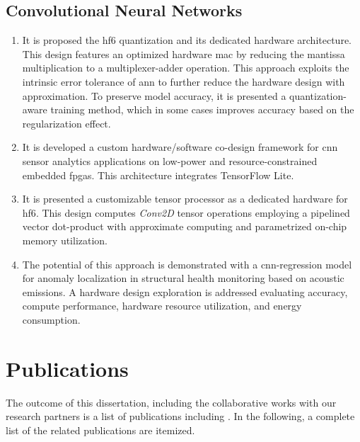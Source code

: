 \subsection{Convolutional Neural Networks}
\begin{enumerate}
	\item It is proposed the \gls{hf6} quantization and its dedicated hardware architecture. This design features an optimized hardware \gls{mac} by reducing the mantissa multiplication to a multiplexer-adder operation. This approach exploits the intrinsic error tolerance of \gls{ann} to further reduce the hardware design with approximation. To preserve model accuracy, it is presented a quantization-aware training method, which in some cases improves accuracy based on the regularization effect.
	
	\item It is developed a custom hardware/software co-design framework for \gls{cnn} sensor analytics applications on low-power and resource-constrained embedded \glspl{fpga}. This architecture integrates TensorFlow Lite.
	
	\item It is presented a customizable tensor processor as a dedicated hardware for \gls{hf6}. This design computes \emph{Conv2D} tensor operations employing a pipelined vector dot-product with approximate computing and parametrized on-chip memory utilization.
	
	\item The potential of this approach is demonstrated with a \gls{cnn}-regression model for anomaly localization in structural health monitoring based on acoustic emissions. A hardware design exploration is addressed evaluating accuracy, compute performance, hardware resource utilization, and energy consumption.
\end{enumerate}

\section{Publications}
The outcome of this dissertation, including the collaborative works with our research partners is a list of publications including \cite{nevarez2020accelerator, nevarez2021accelerating, yn2022cnnsensor}. In the following, a complete list of the related publications are itemized.


